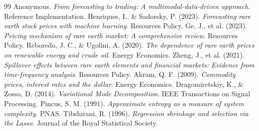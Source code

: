\documentclass[11pt,a4paper]{article}
\begin{document}
\begin{thebibliography}{99}
 Anonymous. \textit{From forecasting to trading: A multimodal-data-driven approach}. Reference Implementation.
 Henriques, I., \& Sadorsky, P. (2023). \textit{Forecasting rare earth stock prices with machine learning}. Resources Policy.
 Ge, J., et al. (2023). \textit{Pricing mechanism of rare earth market: A comprehensive review}. Resources Policy.
 Reboredo, J. C., \& Ugolini, A. (2020). \textit{The dependence of rare earth prices on renewable energy and crude oil}. Energy Economics.
 Zheng, J., et al. (2021). \textit{Spillover effects between rare earth elements and financial markets: Evidence from time-frequency analysis}. Resources Policy.
 Akram, Q. F. (2009). \textit{Commodity prices, interest rates and the dollar}. Energy Economics.
 Dragomiretskiy, K., \& Zosso, D. (2014). \textit{Variational Mode Decomposition}. IEEE Transactions on Signal Processing.
 Pincus, S. M. (1991). \textit{Approximate entropy as a measure of system complexity}. PNAS.
 Tibshirani, R. (1996). \textit{Regression shrinkage and selection via the Lasso}. Journal of the Royal Statistical Society.
\end{thebibliography}
\end{document}
